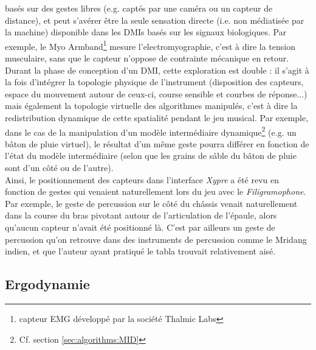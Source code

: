 basés sur des gestes libres (e.g. captés par une caméra ou un capteur de distance), et peut s'avérer être la seule sensation directe (i.e. non médiatisée par la machine) disponible dans les \glspl{DMI} basés sur les signaux biologiques. Par exemple, le Myo Armband\footnote{capteur EMG développé par la société Thalmic Labs} mesure l'electromyographie, c'est à dire la tension musculaire, sans que le capteur n'oppose de contrainte mécanique en retour.\\
\indent Durant la phase de conception d'un \gls{DMI}, cette exploration est double : il s'agit à la fois d'intégrer la topologie physique de l'instrument (disposition des capteurs, espace du mouvement autour de ceux-ci, course sensible et courbes de réponse...) mais également la topologie virtuelle des algorithmes manipulés, c'est à dire la redistribution dynamique de cette spatialité pendant le jeu musical. Par exemple, dans le cas de la manipulation d'un modèle intermédiaire dynamique\footnote{Cf. section \ref{sec:algorithms:MID}} (e.g. un bâton de pluie virtuel), le résultat d'un même geste pourra différer en fonction de l'état du modèle intermédiaire (selon que les grains de sâble du bâton de pluie sont d'un côté ou de l'autre).\\
\indent Ainsi, le positionnement des capteurs dans l'interface \textit{Xypre} a été revu en fonction de gestes qui venaient naturellement lors du jeu avec le \textit{Filigramophone}. Par exemple, le geste de percussion sur le côté du châssis venait naturellement dans la course du bras pivotant autour de l'articulation de l'épaule, alors qu'aucun capteur n'avait été positionné là. C'est par ailleurs un geste de percussion qu'on retrouve dans des instruments de percussion comme le Mridang indien, et que l'auteur ayant pratiqué le tabla trouvait relativement aisé.



\subsection{Ergodynamie}

